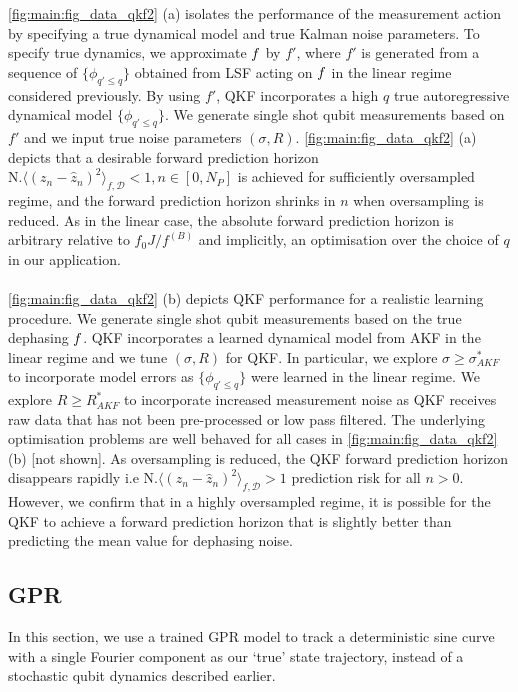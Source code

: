 \cref{fig:main:fig_data_qkf2} (a) isolates the performance of the measurement action by specifying a true dynamical model and true Kalman noise parameters. To specify true dynamics, we approximate $f$ by $f'$, where $f'$ is generated from a sequence of $\{ \phi_{q'\leq q}\}$ obtained from LSF acting on $f$ in the linear regime considered previously. By using $f'$, QKF incorporates a high $q$ true autoregressive dynamical model $\{ \phi_{q'\leq q}\}$. We generate single shot qubit measurements based on $f'$ and we input true noise parameters $(\sigma, R)$. \cref{fig:main:fig_data_qkf2} (a) depicts that a desirable forward prediction horizon $\text{N.} \langle (z_n - \hat{z}_n)^2 \rangle_{f, \mathcal{D}} < 1, n\in [0, N_P] $ is achieved for sufficiently oversampled regime, and the forward prediction horizon shrinks in $n$ when oversampling is reduced. As in the linear case, the absolute forward prediction horizon is arbitrary relative to $f_0 J / f^{(B)}$ and implicitly, an optimisation over the choice of $q$ in our application. 
\\
\\
\cref{fig:main:fig_data_qkf2} (b) depicts QKF performance for a realistic learning procedure. We generate single shot qubit measurements based on the true dephasing $f$. QKF incorporates a learned dynamical model from AKF in the linear regime and we tune $(\sigma, R)$ for QKF. In particular, we explore $\sigma \geq \sigma_{AKF}^*$ to incorporate model errors as $\{\phi_{q' \leq q}\}$ were learned in the linear regime.  We explore $R \geq R_{AKF}^*$ to incorporate increased measurement noise as QKF receives raw data that has not been pre-processed or low pass filtered. The underlying optimisation problems are well behaved for all cases in \cref{fig:main:fig_data_qkf2}(b) [not shown]. As oversampling is reduced, the QKF forward prediction horizon disappears rapidly i.e $\text{N.} \langle (z_n - \hat{z}_n)^2 \rangle_{f, \mathcal{D}} > 1 $ prediction risk for all $n>0$.  However, we confirm that in a highly oversampled regime, it is possible for the QKF to achieve a forward prediction horizon that is slightly better than predicting the mean value for dephasing noise. 

\subsection{GPR} 
In this section, we use a trained GPR model to track a deterministic sine curve with a single Fourier component as our `true' state trajectory, instead of a stochastic qubit dynamics described earlier.  
 
